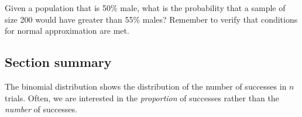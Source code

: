 \begin{exercisewrap}
\begin{nexercise}Given a population that is 50\% male, what is the probability that a sample of size 200 would have greater than 55\% males?  Remember to verify that conditions for normal approximation are met.\footnotemark
\end{nexercise}
\end{exercisewrap}

\subsection*{Section summary}

\noindent The binomial distribution shows the distribution of the number of successes in $n$ trials.  Often, we are interested in the \textit{proportion} of successes rather than the \textit{number} of successes.
